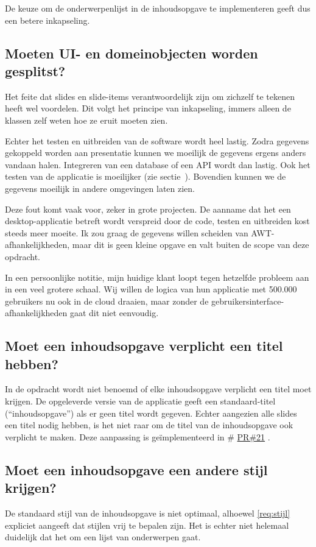 \documentclass[a4paper]{article}
\makeatletter
\newcommand*{\repo}{\begingroup\@makeother\#\@repo}
\newcommand*{\@repo}[2]{%
  \href{https://github.com/DanielSchiavini/design-patterns-assignment/#1}{#2}%
  \endgroup}
\newcommand{\PR}[1]{\repo{pull/#1}{PR\##1}}
\newcommand{\reqref}[1]{\ref{req:#1}}
\newcommand{\question}[1]{
  \subsection{#1}
}
\makeatother
\begin{document}
    De keuze om de onderwerpenlijst in de inhoudsopgave te implementeren geeft dus een betere inkapseling.

    \question{Moeten UI- en domeinobjecten worden gesplitst?}
    \label{q:ui-domein-vermenging}
    Het feite dat slides en slide-items verantwoordelijk zijn om zichzelf te tekenen heeft wel voordelen.
    Dit volgt het principe van inkapseling, immers alleen de klassen zelf weten hoe ze eruit moeten zien.

    Echter het testen en uitbreiden van de software wordt heel lastig.
    Zodra gegevens gekoppeld worden aan presentatie kunnen we moeilijk de gegevens ergens anders vandaan halen.
    Integreren van een database of een API wordt dan lastig.
    Ook het testen van de applicatie is moeilijker (zie sectie~).
    Bovendien kunnen we de gegevens moeilijk in andere omgevingen laten zien.
    
    Deze fout komt vaak voor, zeker in grote projecten.
    De aanname dat het een desktop-applicatie betreft wordt verspreid door de code, testen en uitbreiden kost steeds meer moeite.
    Ik zou graag de gegevens willen scheiden van AWT-afhankelijkheden, maar dit is geen kleine opgave en valt buiten de scope van deze opdracht.

    In een persoonlijke notitie, mijn huidige klant loopt tegen hetzelfde pro\-bleem aan in een veel grotere schaal.
    Wij willen de logica van hun applicatie met 500.000 gebruikers nu ook in de cloud draaien, maar zonder de ge\-bruik\-ers\-inter\-face-afhankelijkheden gaat dit niet eenvoudig.

    \question{Moet een inhoudsopgave verplicht een titel hebben?}
    In de opdracht wordt niet benoemd of elke inhoudsopgave verplicht een titel moet krijgen.
    De opgeleverde versie van de applicatie geeft een standaard-titel (``inhoudsopgave'') als er geen titel wordt gegeven.
    Echter aangezien alle slides een titel nodig hebben, is het niet raar om de titel van de inhoudsopgave ook verplicht te maken.
    Deze aanpassing is geïmplementeerd in \PR{21}.
    
    \question{Moet een inhoudsopgave een andere stijl krijgen?}
    De standaard stijl van de inhoudsopgave is niet optimaal, alhoewel \reqref{stijl} expliciet aangeeft dat stijlen vrij te bepalen zijn.
    Het is echter niet helemaal duidelijk dat het om een lijst van onderwerpen gaat.
    
\end{document}
